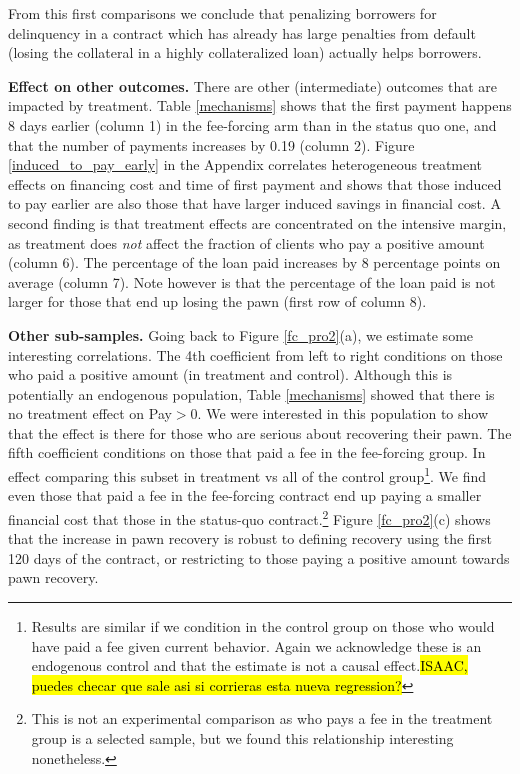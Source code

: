 \documentclass[11pt]{article}
\begin{document}

\vspace{.1in}
\noindent From this first comparisons we conclude that penalizing borrowers for delinquency in a contract which has already has large penalties from default (losing the collateral in a highly collateralized loan) actually helps borrowers.

\vspace{.2in}
\noindent \textbf{Effect on other outcomes.} There are other (intermediate) outcomes that are impacted by treatment. Table \ref{mechanisms} shows that the first payment happens 8 days earlier (column 1) in the fee-forcing arm than in the status quo one, and that the number of payments increases by 0.19 (column 2). Figure \ref{induced_to_pay_early} in the Appendix correlates heterogeneous treatment effects on financing cost and time of first payment and shows that those induced to pay earlier are also those that have larger induced savings in financial cost. A second finding is that treatment effects are concentrated on the intensive margin, as treatment does \textit{not} affect the fraction of clients who pay a positive amount (column 6). The percentage of the loan paid increases by 8 percentage points on average (column 7). Note however is that the percentage of the loan paid is not larger for those that end up losing the pawn (first row of column 8).

\vspace{.2in}
\noindent \textbf{Other sub-samples.} Going back to Figure \ref{fc_pro2}(a), we estimate some interesting correlations. The 4th coefficient from left to right conditions on those who paid a positive amount (in treatment and control). Although this is potentially an endogenous population, Table \ref{mechanisms} showed that there is no treatment effect on Pay$>$0. We were interested in this population to show that the effect is there for those who are serious about recovering their pawn. The fifth coefficient conditions on those that paid a fee in the fee-forcing group. In effect comparing this subset in treatment vs all of the control group\footnote{Results are similar if we condition in the control group on those who would have paid a fee given current behavior. Again we acknowledge these is an endogenous control and that the estimate is not a causal effect.\hl{ISAAC, puedes checar que sale asi si corrieras esta nueva regression?}}. We find even those that paid a fee in the fee-forcing contract end up paying a smaller financial cost that those in the status-quo contract.\footnote{This is not an experimental comparison as who pays a fee in the treatment group is a selected sample, but we found this relationship interesting nonetheless.} Figure \ref{fc_pro2}(c) shows that the increase in pawn recovery is robust to defining recovery using the first 120 days of the contract, or restricting to those paying a positive amount towards pawn recovery.
\end{document}
